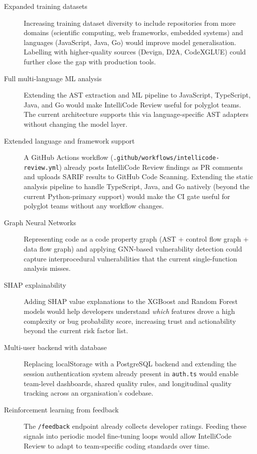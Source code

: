 \documentclass[12pt, oneside]{report}
\begin{document}
\begin{description}
  \item[Expanded training datasets] Increasing training dataset diversity to include
    repositories from more domains (scientific computing, web frameworks, embedded
    systems) and languages (JavaScript, Java, Go) would improve model generalisation.
    Labelling with higher-quality sources (Devign, D2A, CodeXGLUE) could further close
    the gap with production tools.

  \item[Full multi-language ML analysis] Extending the AST extraction and ML pipeline to
    JavaScript, TypeScript, Java, and Go would make IntelliCode Review useful for polyglot
    teams. The current architecture supports this via language-specific AST adapters without
    changing the model layer.

  \item[Extended language and framework support] A GitHub Actions workflow
    (\texttt{.github/workflows/intellicode-review.yml}) already posts IntelliCode Review
    findings as PR comments and uploads SARIF results to GitHub Code Scanning.
    Extending the static analysis pipeline to handle TypeScript, Java, and Go natively
    (beyond the current Python-primary support) would make the CI gate useful for
    polyglot teams without any workflow changes.

  \item[Graph Neural Networks] Representing code as a code property graph (AST + control
    flow graph + data flow graph) and applying GNN-based vulnerability detection could
    capture interprocedural vulnerabilities that the current single-function analysis misses.

  \item[SHAP explainability] Adding SHAP value explanations to the XGBoost and Random
    Forest models would help developers understand \textit{which} features drove a high
    complexity or bug probability score, increasing trust and actionability beyond the
    current risk factor list.

  \item[Multi-user backend with database] Replacing localStorage with a PostgreSQL backend
    and extending the session authentication system already present in \texttt{auth.ts}
    would enable team-level dashboards, shared quality rules, and longitudinal quality
    tracking across an organisation's codebase.

  \item[Reinforcement learning from feedback] The \texttt{/feedback} endpoint already
    collects developer ratings. Feeding these signals into periodic model fine-tuning
    loops would allow IntelliCode Review to adapt to team-specific coding standards
    over time.
\end{description}
\end{document}
